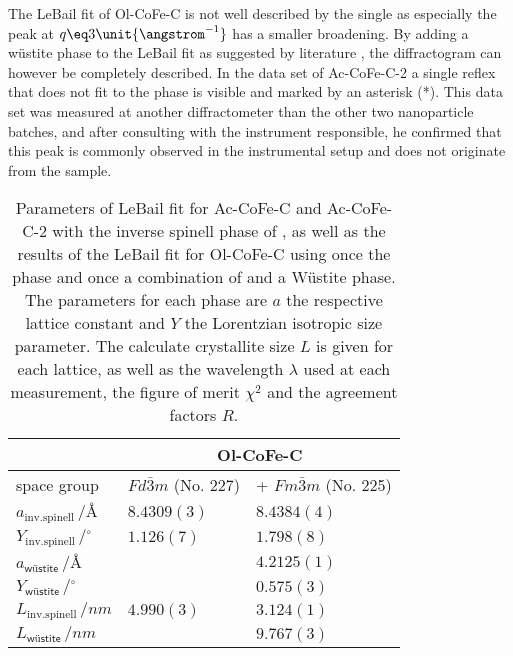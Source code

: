 \documentclass[\main/dresen_thesis.tex]{subfiles}
\begin{document}
  The LeBail fit of Ol-CoFe-C is not well described by the single  as especially the peak at $q \eq 3 \unit{\angstrom^{-1}}$ has a smaller broadening.
  By adding a w\"ustite phase to the LeBail fit as suggested by literature \cite{Bodnarchuk_2009_Excha}, the diffractogram can however be completely described.
  In the data set of Ac-CoFe-C-2 a single reflex that does not fit to the phase is visible and marked by an asterisk (*).
  This data set was measured at another diffractometer than the other two nanoparticle batches, and after consulting with the instrument responsible, he confirmed that this peak is commonly observed in the instrumental setup and does not originate from the sample.
  \begin{table}[ht]
    \centering
    \caption{\label{tab:monolayers:nanoparticle:discussion:xrdLeBail}Parameters of LeBail fit for Ac-CoFe-C and Ac-CoFe-C-2 with the inverse spinell phase of , as well as the results of the LeBail fit for Ol-CoFe-C using once the  phase and once a combination of  and a W\"ustite phase. The parameters for each phase are $a$ the respective lattice constant and $Y$ the Lorentzian isotropic size parameter. The calculate crystallite size $L$ is given for each lattice, as well as the wavelength $\lambda$ used at each measurement, the figure of merit $\chi^2$ and the agreement factors $R$.}
    \begin{tabular}{ l | l | l }
      \hline
      \rule{0pt}{2ex} & \multicolumn{2}{c}{\textbf{Ol-CoFe-C}}\\
      \hline
      \hline
      \rule{0pt}{2ex}space group & $Fd\bar{3}m$ (No. 227) & + $Fm\bar{3}m$ (No. 225)\\
      \hline
      \rule{0pt}{2ex} $a_\mathrm{inv. spinell} \,/ \unit{\angstrom}$         & $8.4309(3)$ & $8.4384(4)$  \\
      \rule{0pt}{2ex} $Y_\mathrm{inv. spinell} \,/ \unit{^\circ}$            & $1.126(7)$  & $1.798(8)$   \\
      \rule{0pt}{2ex} $a_\textsf{w\"ustite}     \,/ \unit{\angstrom}$        &             & $4.2125(1)$  \\
      \rule{0pt}{2ex} $Y_\textsf{w\"ustite}     \,/ \unit{^\circ}$           &             & $0.575(3)$   \\
      \hline
      \rule{0pt}{2ex} $L_\mathrm{inv. spinell} \,/ \unit{nm}$                & $4.990(3)$  & $3.124(1)$ \\
      \rule{0pt}{2ex} $L_\textsf{w\"ustite}      \,/ \unit{nm}$              &             & $9.767(3)$ \\

\end{tabular}
\end{table}
\end{document}
